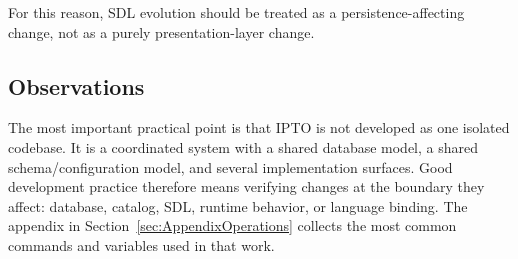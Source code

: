 For this reason, SDL evolution should be treated as a persistence-affecting change, not as a purely presentation-layer change.

\subsection{Observations}

The most important practical point is that IPTO is not developed as one isolated codebase. It is a coordinated system with a shared database model, a shared schema/configuration model, and several implementation surfaces. Good development practice therefore means verifying changes at the boundary they affect: database, catalog, SDL, runtime behavior, or language binding. The appendix in Section~\ref{sec:AppendixOperations} collects the most common commands and variables used in that work.
